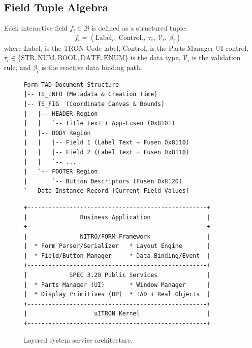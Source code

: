 \documentclass[10pt,journal,compsoc,twocolumn]{article}
\begin{document}
\subsection{Field Tuple Algebra}
Each interactive field $f_i \in \mathcal{B}$ is defined as a structured tuple:
\begin{equation}
f_i = \left( \text{Label}_i,\ \text{Control}_i,\ \tau_i,\ \mathcal{V}_i,\ \beta_i \right)
\end{equation}
where $\text{Label}_i$ is the TRON Code label, $\text{Control}_i$ is the Parts Manager UI control, $\tau_i \in \{ \text{STR}, \text{NUM}, \text{BOOL}, \text{DATE}, \text{ENUM} \}$ is the data type, $\mathcal{V}_i$ is the validation rule, and $\beta_i$ is the reactive data binding path.

\begin{figure}[htbp]
\centering
\begin{minipage}{0.48\textwidth}
\begin{lstlisting}
Form TAD Document Structure
|-- TS_INFO (Metadata & Creation Time)
|-- TS_FIG  (Coordinate Canvas & Bounds)
|   |-- HEADER Region
|   |   `-- Title Text + App-Fusen (0x8101)
|   |-- BODY Region
|   |   |-- Field 1 (Label Text + Fusen 0x8110)
|   |   |-- Field 2 (Label Text + Fusen 0x8110)
|   |   `-- ...
|   `-- FOOTER Region
|       `-- Button Descriptors (Fusen 0x8120)
`-- Data Instance Record (Current Field Values)
\end{lstlisting}
\caption{TAD physical segment layout of a NITRO/FORM.}
\label{fig:tad_structure}
\end{minipage}\hfill
\begin{minipage}{0.48\textwidth}
\begin{lstlisting}
+---------------------------------------------------+
|               Business Application                |
+---------------------------------------------------+
|               NITRO/FORM Framework                |
|  * Form Parser/Serializer   * Layout Engine       |
|  * Field/Button Manager     * Data Binding/Event  |
+---------------------------------------------------+
|            SPEC 3.20 Public Services              |
|  * Parts Manager (UI)       * Window Manager      |
|  * Display Primitives (DP)  * TAD + Real Objects  |
+---------------------------------------------------+
|                   uITRON Kernel                   |
+---------------------------------------------------+
\end{lstlisting}
\caption{Layered system service architecture.}
\label{fig:service_arch}
\end{minipage}
\end{figure}
\end{document}
